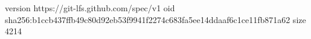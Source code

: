 version https://git-lfs.github.com/spec/v1
oid sha256:b1ccb437ffb49c80d92eb53f9941f2274c683fa5ee14ddaaf6c1ce11fb871a62
size 4214
